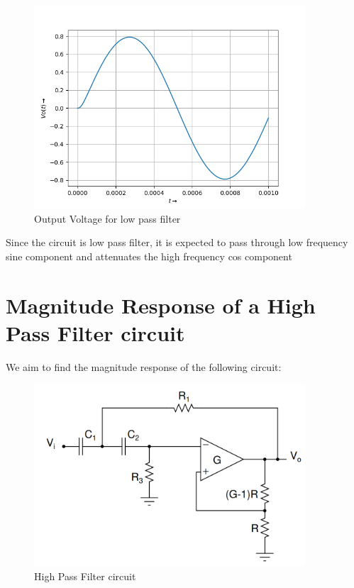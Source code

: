 \documentclass[10pt,a4paper]{article}
\begin{document}
\begin{figure}[!tbh]

\includegraphics[width = 0.9\textwidth]{low pass filter Vo(t) for a Vi(t).png}
\caption{Output Voltage for low pass filter}

\end{figure}

Since the circuit is low pass filter, it is expected to pass through low frequency sine component and attenuates the high frequency cos component


\section{Magnitude Response of a High Pass Filter circuit}


We aim to find the magnitude response of the following circuit:

\begin{figure}[!tbh]

\includegraphics[width = 0.9\textwidth]{high pass filter circuit.png}
\caption{High Pass Filter circuit}

\end{figure}
\end{document}
